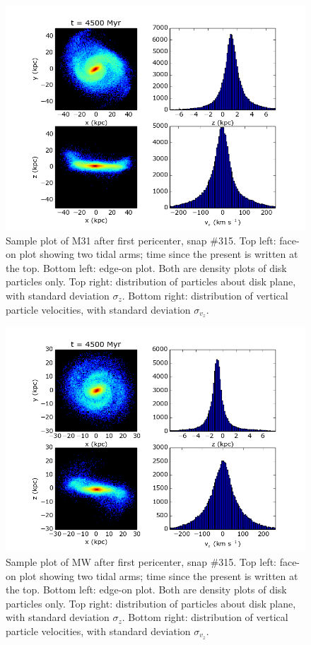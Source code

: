 \documentclass[iop]{emulateapj}
\begin{document}
\begin{figure}[t]
\includegraphics[width=18cm]{../M31_000_599_stats/M31_315.png}
\caption{Sample plot of M31 after first pericenter, snap \#315. Top left: face-on plot showing two tidal arms; time since the present is written at the top. Bottom left: edge-on plot. Both are density plots of disk particles only. Top right: distribution of particles about disk plane, with standard deviation $\sigma_z$. Bottom right: distribution of vertical particle velocities, with standard deviation $\sigma_{v_z}$.}
\label{fig:m31stats}
\end{figure}

\begin{figure}[t]
\includegraphics[width=18cm]{../MW_000_599_stats/MW_315.png}
\caption{Sample plot of MW after first pericenter, snap \#315. Top left: face-on plot showing two tidal arms; time since the present is written at the top. Bottom left: edge-on plot. Both are density plots of disk particles only. Top right: distribution of particles about disk plane, with standard deviation $\sigma_z$. Bottom right: distribution of vertical particle velocities, with standard deviation $\sigma_{v_z}$.}
\label{fig:mwstats}
\end{figure}
\end{document}
